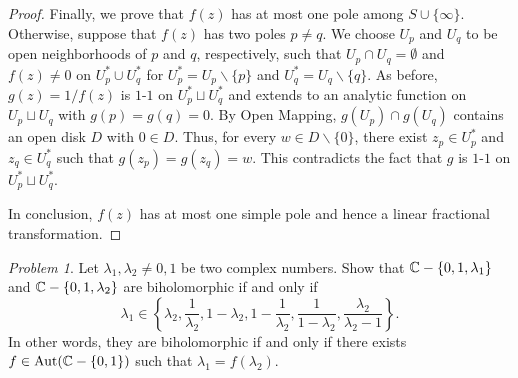 \documentclass[11pt]{amsart}
\theoremstyle{remark}
\newtheorem{prob}{Problem}[section]
\theoremstyle{definition}
\numberwithin{equation}{section}
\begin{document}
\begin{proof}
    Finally, we prove that $f(z)$ has at most one pole among $S\cup \{\infty\}$. Otherwise, suppose that $f(z)$ has two poles $p\ne q$. We choose $U_p$ and $U_q$ to be open neighborhoods of $p$ and $q$, respectively, such that $U_p\cap U_q = \emptyset$ and $f(z)\ne 0$ on
    $U_p^*\cup U_q^*$ for $U_p^* = U_p\backslash \{p\}$ and $U_q^* = U_q\backslash \{q\}$. As before, $g(z) = 1/f(z)$ is $1$-$1$ on $U_p^*\sqcup U_q^*$ and extends to an analytic function on $U_p\sqcup U_q$ with $g(p) = g(q) = 0$. By Open Mapping, $g(U_p)\cap g(U_q)$ contains an open disk $D$ with $0\in D$. Thus, for every $w\in D\backslash \{0\}$, there exist $z_p\in U_p^*$ and $z_q\in U_q^*$ such that
    $g(z_p) = g(z_q) = w$. This contradicts the fact that $g$ is $1$-$1$ on $U_p^*\sqcup U_q^*$.

    In conclusion, $f(z)$ has at most one simple pole and hence a linear fractional transformation.
\end{proof}

\begin{prob}
    Let $\lambda_1, \lambda_2\ne 0,1$ be two complex numbers. Show that ${\mathbb C} - \{0, 1,\lambda_1\}$ and ${\mathbb C} - \{0, 1, \lambda_2\}$ are biholomorphic if and only if
    \[
        \lambda_1 \in \left\{
        \lambda_2, \frac{1}{\lambda_2}, 1 - \lambda_2, 1 - \frac{1}{\lambda_2}, \frac{1}{1-\lambda_2}, \frac{\lambda_2}{\lambda_2 - 1}
        \right\}.
    \]
    In other words, they are biholomorphic if and only if there exists $f\in \mathop{\mathrm{Aut}}\nolimits({\mathbb C} - \{0, 1\})$ such that $\lambda_1 = f(\lambda_2)$.
\end{prob}
\end{document}
